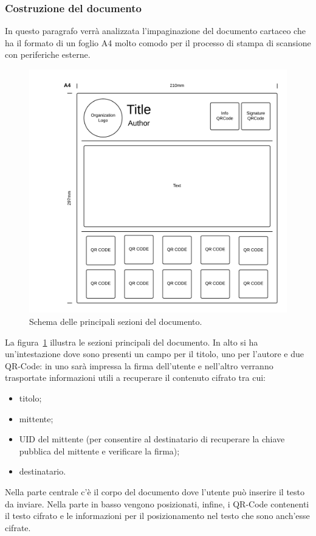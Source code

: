 \subsubsection{Costruzione del documento}
In questo paragrafo verrà analizzata l'impaginazione del documento cartaceo che ha il formato di un foglio A4 molto comodo per il processo di stampa di scansione con periferiche esterne.
	\begin{center}	
		\begin{figure}[H]
		\centering
		\includegraphics[scale=0.7]{Immagini/template}
		\caption[Template del documento]{Schema delle principali sezioni del documento.}
		\label{fig:template}
		\end{figure}
	\end{center}
La figura~\ref{fig:template} illustra le sezioni principali del documento. In alto si ha un'intestazione dove sono presenti un campo per il titolo, uno per l'autore e due QR-Code: in uno sarà impressa la firma dell'utente e nell'altro verranno trasportate informazioni utili a recuperare il contenuto cifrato tra cui:
\begin{itemize}
	\item titolo;
	\item mittente;
	\item UID del mittente (per consentire al destinatario di recuperare la chiave pubblica del mittente e verificare la firma);
	\item destinatario.
\end{itemize}
Nella parte centrale c'è il corpo del documento dove l'utente può inserire il testo da inviare.
Nella parte in basso vengono posizionati, infine, i QR-Code contenenti il testo cifrato e le informazioni per il posizionamento nel testo che sono anch'esse cifrate.

